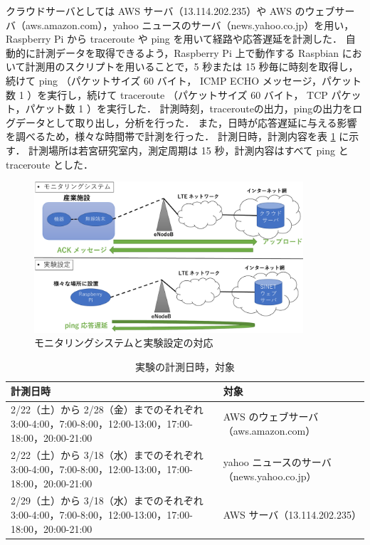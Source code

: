 \documentclass[a4j]{jarticle}
\begin{document}
クラウドサーバとしては AWS サーバ（13.114.202.235）や AWS のウェブサーバ（aws.amazon.com），yahoo ニュースのサーバ（news.yahoo.co.jp）を用い，Raspberry Pi から traceroute や ping を用いて経路や応答遅延を計測した．
自動的に計測データを取得できるよう，Raspberry Pi 上で動作する Raspbian において計測用のスクリプトを用いることで，5 秒または 15 秒毎に時刻を取得し，続けて ping （パケットサイズ 60 バイト， ICMP ECHO メッセージ，パケット数 1 ）を実行し，続けて traceroute （パケットサイズ 60 バイト， TCP パケット，パケット数 1 ）を実行した．
計測時刻，tracerouteの出力，pingの出力をログデータとして取り出し，分析を行った．
また，日時が応答遅延に与える影響を調べるため，様々な時間帯で計測を行った．
計測日時，計測内容を表 \ref{keisoku} に示す．
計測場所は若宮研究室内，測定周期は 15 秒，計測内容はすべて ping と traceroute とした．
\begin{figure}[H]
\centering
\includegraphics[width=10.0cm]{../figure/experiment.pdf}
\caption{モニタリングシステムと実験設定の対応}
\label{exp}
\end{figure}

\begin{table}[H]
\centering
\caption{実験の計測日時，対象}
\label{keisoku}
\begin{tabular}{|p{7cm}|p{7cm}|}
\hline
計測日時&対象\\
\hline
2/22（土）から 2/28（金）までのそれぞれ 3:00-4:00，7:00-8:00，12:00-13:00，17:00-18:00，20:00-21:00& AWS のウェブサーバ（aws.amazon.com）\\
\hline
2/22（土）から 3/18（水）までのそれぞれ 3:00-4:00，7:00-8:00，12:00-13:00，17:00-18:00，20:00-21:00& yahoo ニュースのサーバ（news.yahoo.co.jp）\\
\hline
2/29（土）から 3/18（水）までのそれぞれ 3:00-4:00，7:00-8:00，12:00-13:00，17:00-18:00，20:00-21:00&  AWS サーバ（13.114.202.235）\\
\hline
\end{tabular}
\end{table}
\end{document}
